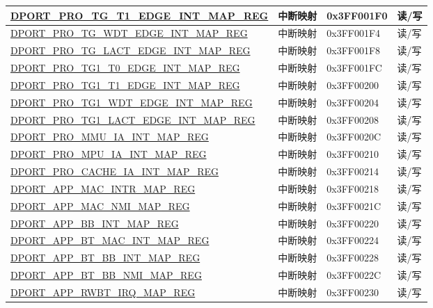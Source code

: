 \begin{longtable}{|L{8.2cm}|L{4.5cm}| l | l | }
\hyperref[regdesc:PROTGT1EDGEINTMAPREG]{DPORT\_PRO\_TG\_T1\_EDGE\_INT\_MAP\_REG} & 中断映射 & 0x3FF001F0 & 读/写 \\ \hline
\hyperref[regdesc:PROTGWDTEDGEINTMAPREG]{DPORT\_PRO\_TG\_WDT\_EDGE\_INT\_MAP\_REG} & 中断映射 & 0x3FF001F4 & 读/写 \\ \hline
\hyperref[regdesc:PROTGLACTEDGEINTMAPREG]{DPORT\_PRO\_TG\_LACT\_EDGE\_INT\_MAP\_REG} & 中断映射 & 0x3FF001F8 & 读/写 \\ \hline
\hyperref[regdesc:PROTG1T0EDGEINTMAPREG]{DPORT\_PRO\_TG1\_T0\_EDGE\_INT\_MAP\_REG} & 中断映射 & 0x3FF001FC & 读/写 \\ \hline
\hyperref[regdesc:PROTG1T1EDGEINTMAPREG]{DPORT\_PRO\_TG1\_T1\_EDGE\_INT\_MAP\_REG} & 中断映射 & 0x3FF00200 & 读/写 \\ \hline
\hyperref[regdesc:PROTG1WDTEDGEINTMAPREG]{DPORT\_PRO\_TG1\_WDT\_EDGE\_INT\_MAP\_REG} & 中断映射 & 0x3FF00204 & 读/写 \\ \hline
\hyperref[regdesc:PROTG1LACTEDGEINTMAPREG]{DPORT\_PRO\_TG1\_LACT\_EDGE\_INT\_MAP\_REG} & 中断映射 & 0x3FF00208 & 读/写 \\ \hline
\hyperref[regdesc:PROMMUIAINTMAPREG]{DPORT\_PRO\_MMU\_IA\_INT\_MAP\_REG} & 中断映射 & 0x3FF0020C & 读/写 \\ \hline
\hyperref[regdesc:PROMPUIAINTMAPREG]{DPORT\_PRO\_MPU\_IA\_INT\_MAP\_REG} & 中断映射 & 0x3FF00210 & 读/写 \\ \hline
\hyperref[regdesc:PROCACHEIAINTMAPREG]{DPORT\_PRO\_CACHE\_IA\_INT\_MAP\_REG} & 中断映射 & 0x3FF00214 & 读/写 \\ \hline
\hyperref[regdesc:APPMACINTRMAPREG]{DPORT\_APP\_MAC\_INTR\_MAP\_REG} & 中断映射 & 0x3FF00218 & 读/写 \\ \hline
\hyperref[regdesc:APPMACNMIMAPREG]{DPORT\_APP\_MAC\_NMI\_MAP\_REG} & 中断映射 & 0x3FF0021C & 读/写 \\ \hline
\hyperref[regdesc:APPBBINTMAPREG]{DPORT\_APP\_BB\_INT\_MAP\_REG} & 中断映射 & 0x3FF00220 & 读/写 \\ \hline
\hyperref[regdesc:APPBTMACINTMAPREG]{DPORT\_APP\_BT\_MAC\_INT\_MAP\_REG} & 中断映射 & 0x3FF00224 & 读/写 \\ \hline
\hyperref[regdesc:APPBTBBINTMAPREG]{DPORT\_APP\_BT\_BB\_INT\_MAP\_REG} & 中断映射 & 0x3FF00228 & 读/写 \\ \hline
\hyperref[regdesc:APPBTBBNMIMAPREG]{DPORT\_APP\_BT\_BB\_NMI\_MAP\_REG} & 中断映射 & 0x3FF0022C & 读/写 \\ \hline
\hyperref[regdesc:APPRWBTIRQMAPREG]{DPORT\_APP\_RWBT\_IRQ\_MAP\_REG} & 中断映射 & 0x3FF00230 & 读/写 \\ \hline

\end{longtable}
